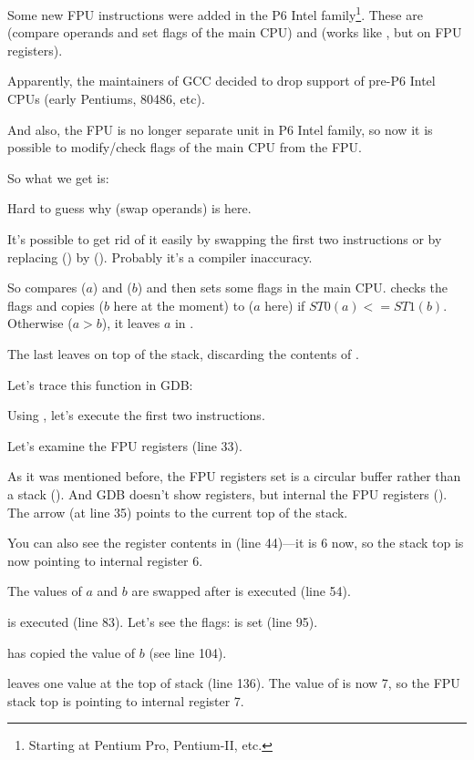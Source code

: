 \label{gcc481_o3}

Some new FPU instructions were added in the P6 Intel family\footnote{Starting at Pentium Pro, Pentium-II, etc.}.
These are  (compare operands and set flags of the main CPU) and 
 (works like , but on FPU registers).

Apparently, the maintainers of GCC decided to drop support of pre-P6 Intel CPUs (early Pentiums, 80486, etc{}).

And also, the FPU is no longer separate unit in P6 Intel family, so now it is possible to modify/check flags of the main CPU from the FPU.

So what we get is:



Hard to guess why  (swap operands) is here.

It's possible to get rid of it easily by swapping the first two \FLD instructions or by replacing 
 () by  ().
Probably it's a compiler inaccuracy.

So  compares  ($a$) and  ($b$) 
and then sets some flags in the main CPU.
 checks the flags and copies  
($b$ here at the moment) to 
 ($a$ here) if $ST0 (a) <= ST1 (b)$.
Otherwise ($a>b$), it leaves $a$ in .

The last \FSTP leaves  on top of the stack, discarding the contents of .

Let's trace this function in GDB:



Using , 
let's execute the first two \FLD instructions.

Let's examine the FPU registers (line 33).

As it was mentioned before, the FPU registers set is a circular buffer rather than a stack ().
And GDB doesn't show  registers, but internal the FPU registers (). 
The arrow (at line 35) points to the current top of the stack.

You can also see the  register contents in  (line 44)---it is 6 now, 
so the stack top is now pointing to internal register 6.

The values of $a$ and $b$ are swapped after  is executed (line 54).

 is executed (line 83). 
Let's see the flags: \CF is set (line 95).

 has copied the value of $b$ (see line 104).

\FSTP leaves one value at the top of stack (line 136). 
The value of  is now 7, so the FPU stack top is pointing to internal register 7.

